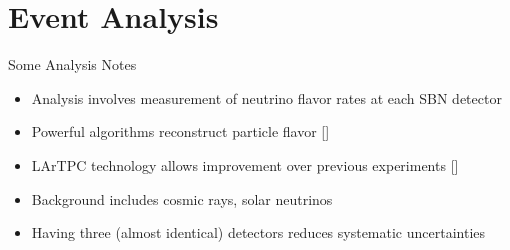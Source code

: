 \documentclass{beamer}
\begin{document}
\section{Event Analysis}

\begin{frame}{Some Analysis Notes}
    \begin{itemize}
         \item Analysis involves measurement of neutrino flavor rates at each SBN detector
        \vspace{0.5cm}
        \item Powerful algorithms reconstruct particle flavor \footnotesize[\cite{neutrino-snowmass}\normalsize]
        \vspace{0.5cm}
        \item LArTPC technology allows improvement over previous experiments \footnotesize[\cite{SBN-Paper}]\normalsize
        \vspace{0.5cm}
        \item Background includes cosmic rays, solar neutrinos
        \vspace{0.5cm}
        \item Having three (almost identical) detectors reduces systematic uncertainties
    \end{itemize}   
\end{frame}
\end{document}
